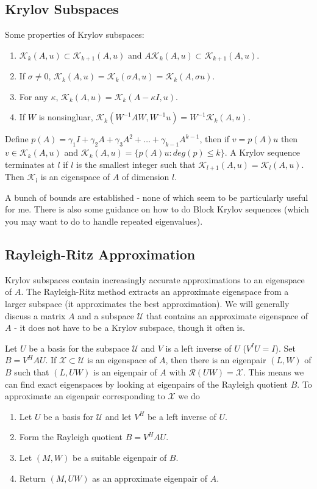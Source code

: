 \documentclass[12pt,twoside]{article}
\newcommand{\cl}[1]{\ensuremath{\mathcal{#1}}}
\newcommand{\epair}{eigenpair }
\begin{document}
\subsection{Krylov Subspaces}
Some properties of Krylov subspaces: 
\begin{enumerate}
  \item $\mathcal{K}_k(A,u) \subset \mathcal{K}_{k+1}(A,u)$ and $A\mathcal{K}_k(A,u) \subset \mathcal{K}_{k+1}(A,u)$.
  \item If $\sigma \ne 0$, $\mathcal{K}_k(A,u) = \mathcal{K}_k(\sigma A,u) = \mathcal{K}_k(A,\sigma u)$.
  \item For any $\kappa$, $\mathcal{K}_k(A,u) = \mathcal{K}_k(A - \kappa I,u)$.
  \item If $W$ is nonsingluar, $\mathcal{K}_k(W^{-1}AW, W^{-1}u) = W^{-1}\mathcal{K}_k(A,u)$.
\end{enumerate}
Define $p(A) = \gamma_1 I + \gamma_2 A + \gamma_3 A^2 + \dots + \gamma_{k-1}A^{k-1}$, then if $v = p(A)u$ then $v \in \mathcal{K}_k(A, u)$ and $\mathcal{K}_k(A, u) = \{p(A)u: deg(p) \le k\}$. A Krylov sequence terminates at $l$ if $l$ is the smallest integer such that $\mathcal{K}_{l+1}(A,u) = \mathcal{K}_l(A,u)$. Then $\mathcal{K}_l$ is an eigenspace of $A$ of dimension $l$. 

A bunch of bounds are established - none of which seem to be particularly useful for me. There is also some guidance on how to do Block Krylov sequences (which you may want to do to handle repeated eigenvalues).

\subsection{Rayleigh-Ritz Approximation}
Krylov subspaces contain increasingly accurate approximations to an eigenspace of $A$. The Rayleigh-Ritz method extracts an approximate eigenspace from a larger subspace (it approximates the best approximation). We will generally discuss a matrix $A$ and a subspace $\mathcal{U}$ that contains an approximate eigenspace of $A$ - it does not have to be a Krylov subspace, though it often is. 

Let $U$ be a basis for the subspace $\mathcal{U}$ and $V$ is a left inverse of $U$ ($V^IU = I$). Set $B = V^HAU$. If $\mathcal{X} \subset \mathcal{U}$ is an eigenspace of $A$, then there is an eigenpair $(L,W)$ of $B$ such that $(L,UW)$ is an eigenpair of $A$ with $\mathcal{R}(UW) = \mathcal{X}$. This means we can find exact eigenspaces by looking at eigenpairs of the Rayleigh quotient $B$. To approximate an \epair corresponding to \cl{X} we do
\begin{enumerate}
  \item Let $U$ be a basis for \cl{U} and let $V^H$ be a left inverse of $U$.
  \item Form the Rayleigh quotient $B=V^HAU$.
  \item Let $(M,W)$ be a suitable \epair of $B$.
  \item Return $(M,UW)$ as an approximate \epair of $A$.
\end{enumerate}
\end{document}

